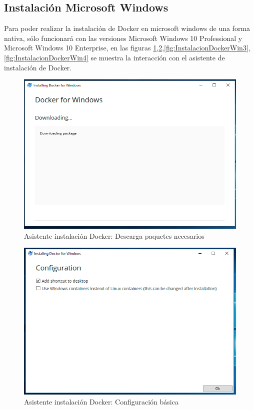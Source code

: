 \subsection{Instalación Microsoft Windows}
Para poder realizar la instalación de Docker en microsoft windows de una forma nativa, sólo funcionará con las versiones Microsoft Windows 10 Professional y Microsoft Windows 10 Enterprise, en las figuras \ref{fig:InstalacionDockerWin1},\ref{fig:InstalacionDockerWin2},\ref{fig:InstalacionDockerWin3},\ref{fig:InstalacionDockerWin4} se muestra la interacción con el asistente de instalación de Docker.

\begin{figure}[!hbtp]
	\centering
	\includegraphics[width=\linewidth]{Trabajo/RecursosEducativos/RE05_Docker/Instalacion_Windows/REDocker_Instalacion_Windows01.png}
	\vspace{-0.2cm}
	\caption{Asistente instalación Docker: Descarga paquetes necesarios}
	\label{fig:InstalacionDockerWin1}
\end{figure}

\begin{figure}[!hbtp]
	\centering
	\includegraphics[width=\linewidth]{Trabajo/RecursosEducativos/RE05_Docker/Instalacion_Windows/REDocker_Instalacion_Windows02.png}
	\vspace{-0.2cm}
	\caption{Asistente instalación Docker: Configuración básica}
	\label{fig:InstalacionDockerWin2}
\end{figure}

